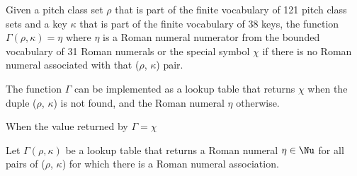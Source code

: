 
Given a pitch class set $\rho$ that is part of the finite
vocabulary of 121 pitch class sets and a key $\kappa$ that
is part of the finite vocabulary of 38 keys, the function
$\Gamma(\rho, \kappa) = \eta$ where $\eta$ is a Roman
numeral numerator from the bounded vocabulary of 31 Roman
numerals or the special symbol $\chi$ if there is no Roman
numeral associated with that ($\rho$, $\kappa$) pair.

The function $\Gamma$ can be implemented as a lookup table
that returns $\chi$ when the duple ($\rho$, $\kappa$) is not
found, and the Roman numeral $\eta$ otherwise.

When the value returned by $\Gamma = \chi$

Let $\Gamma(\rho, \kappa)$ be a lookup table that returns a
Roman numeral $\eta \in \Nu$ for all pairs of ($\rho$,
$\kappa$) for which there is a Roman numeral association. 
